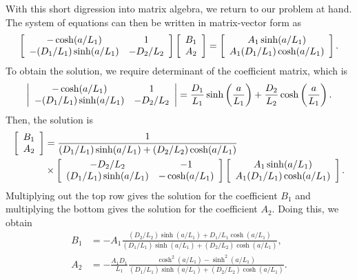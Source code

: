 With this short digression into matrix algebra, we return to our problem at hand. The system of equations can then be written in matrix-vector form as
\begin{align}
  \left[ \begin{array}{c c}
  - \cosh(a/L_1)			& 1				\\
  - (D_1/L_1) \sinh(a/L_1)	& - D_2/L_2		\end{array} \right]
  \left[ \begin{array}{c} B_1 \\ A_2 \end{array} \right] =
  \left[ \begin{array}{c} A_1 \sinh(a/L_1) \\ A_1  (D_1/L_1) \cosh(a/L_1) \end{array} \right] .
\end{align}
To obtain the solution, we require determinant of the coefficient matrix, which is
\begin{align}
  \left| \begin{array}{c c}
  - \cosh(a/L_1)			& 1				\\
  - (D_1/L_1) \sinh(a/L_1)	& - D_2/L_2		\end{array} \right|
  = \frac{D_1}{L_1} \sinh\left( \frac{a}{L_1} \right) + \frac{D_2}{L_2} \cosh\left( \frac{a}{L_1} \right) .
\end{align}
Then, the solution is
\begin{align}
   \left[ \begin{array}{c} B_1 \\ A_2 \end{array} \right] 
   &= \frac{1}{ (D_1/L_1) \sinh(a/L_1) + (D_2/L_2) \cosh(a/L_1) } \nonumber \\
   &\times \left[ \begin{array}{c c}
  	-D_2/L_2				& -1				\\
  	(D_1/L_1) \sinh(a/L_1)	& - \cosh(a/L_1)	\end{array} \right] 
	\left[ \begin{array}{c} A_1 \sinh(a/L_1) \\ A_1  (D_1/L_1) \cosh(a/L_1) \end{array} \right] .
\end{align}
Multiplying out the top row gives the solution for the coefficient $B_1$ and multiplying the bottom gives the solution for the coefficient $A_2$. Doing this, we obtain
\begin{subequations}
\begin{align}
  B_1 &= -A_1 \frac{ (D_2/L_2) \sinh(a/L_1) + D_1/L_1 \cosh(a/L_1) }{ (D_1/L_1) \sinh(a/L_1) + (D_2/L_2) \cosh(a/L_1) }, \\
  A_2 &= -\frac{A_1 D_1}{L_1} \frac{  \cosh^2(a/L_1) - \sinh^2(a/L_1) }{ (D_1/L_1) \sinh(a/L_1) + (D_2/L_2) \cosh(a/L_1) } .
\end{align}
\end{subequations}
